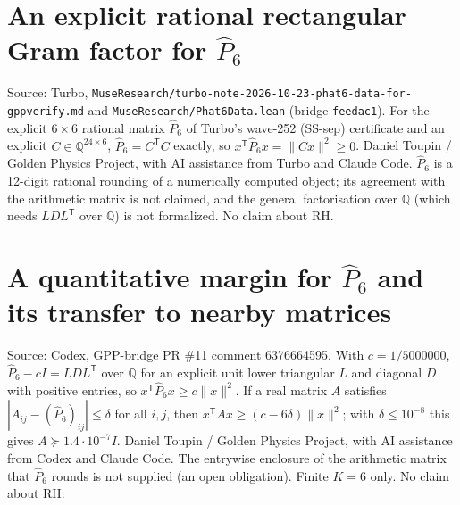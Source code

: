 \documentclass{report}
\theoremstyle{definition}
\begin{document}
\begin{itemize}
\begin{itemize}
\section{An explicit rational rectangular Gram factor for $\hat P_6$}
Source: Turbo, \texttt{MuseResearch/turbo-note-2026-10-23-phat6-data-for-gppverify.md} and \texttt{MuseResearch/Phat6Data.lean} (bridge \texttt{feedac1}).
For the explicit $6\times6$ rational matrix $\hat P_6$ of Turbo's wave-252 (SS-sep) certificate and an explicit $C\in\mathbb Q^{24\times6}$, $\hat P_6=C^{\mathsf T}C$
exactly, so $x^{\mathsf T}\hat P_6x=\|Cx\|^2\ge0$. Daniel Toupin / Golden Physics Project, with AI assistance from Turbo and Claude Code. $\hat P_6$ is a
12-digit rational rounding of a numerically computed object; its agreement with the arithmetic matrix is not claimed, and the general factorisation over
$\mathbb Q$ (which needs $LDL^{\mathsf T}$ over $\mathbb Q$) is not formalized. No claim about RH.

\section{A quantitative margin for $\hat P_6$ and its transfer to nearby matrices}
Source: Codex, GPP-bridge PR \#11 comment 6376664595. With $c=1/5000000$, $\hat P_6-cI=LDL^{\mathsf T}$ over $\mathbb Q$ for an explicit unit lower triangular $L$
and diagonal $D$ with positive entries, so $x^{\mathsf T}\hat P_6x\ge c\|x\|^2$. If a real matrix $A$ satisfies $|A_{ij}-(\hat P_6)_{ij}|\le\delta$ for all $i,j$, then
$x^{\mathsf T}Ax\ge(c-6\delta)\|x\|^2$; with $\delta\le10^{-8}$ this gives $A\succeq1.4\cdot10^{-7}I$. Daniel Toupin / Golden Physics Project, with AI assistance from
Codex and Claude Code. The entrywise enclosure of the arithmetic matrix that $\hat P_6$ rounds is not supplied (an open obligation). Finite $K=6$ only. No
claim about RH.


\end{itemize}
\end{itemize}
\end{document}

